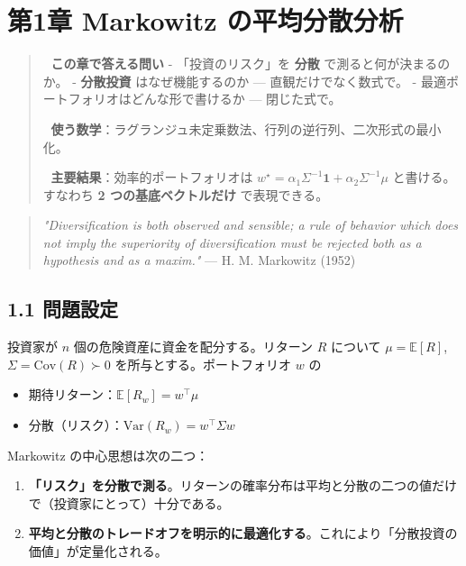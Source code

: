 \documentclass[11pt,a4paper]{report}
\begin{document}
\noindent\hrulefill

\chapter{第1章 Markowitz の平均分散分析}

\begin{quote}
🎯 \textbf{この章で答える問い}
- 「投資のリスク」を \textbf{分散} で測ると何が決まるのか。
- \textbf{分散投資} はなぜ機能するのか — 直観だけでなく数式で。
- 最適ポートフォリオはどんな形で書けるか — 閉じた式で。

📐 \textbf{使う数学}：ラグランジュ未定乗数法、行列の逆行列、二次形式の最小化。

🔑 \textbf{主要結果}：効率的ポートフォリオは $w^\star = \alpha_1 \Sigma^{-1} \mathbf{1} + \alpha_2 \Sigma^{-1} \mu$ と書ける。すなわち \textbf{2 つの基底ベクトルだけ} で表現できる。
\end{quote}

\begin{quote}
\emph{"Diversification is both observed and sensible; a rule of behavior which does not imply the superiority of diversification must be rejected both as a hypothesis and as a maxim."}  — H. M. Markowitz (1952)
\end{quote}

\section{1.1 問題設定}

投資家が $n$ 個の危険資産に資金を配分する。リターン $R$ について $\mu = \mathbb{E}[R]$, $\Sigma = \mathrm{Cov}(R) \succ 0$ を所与とする。ポートフォリオ $w$ の

\begin{itemize}
\item 期待リターン：$\mathbb{E}[R_w] = w^\top \mu$
\item 分散（リスク）：$\mathrm{Var}(R_w) = w^\top \Sigma w$
\end{itemize}

Markowitz の中心思想は次の二つ：

\begin{enumerate}
\item \textbf{「リスク」を分散で測る}。リターンの確率分布は平均と分散の二つの値だけで（投資家にとって）十分である。
\item \textbf{平均と分散のトレードオフを明示的に最適化する}。これにより「分散投資の価値」が定量化される。
\end{enumerate}
\end{document}

